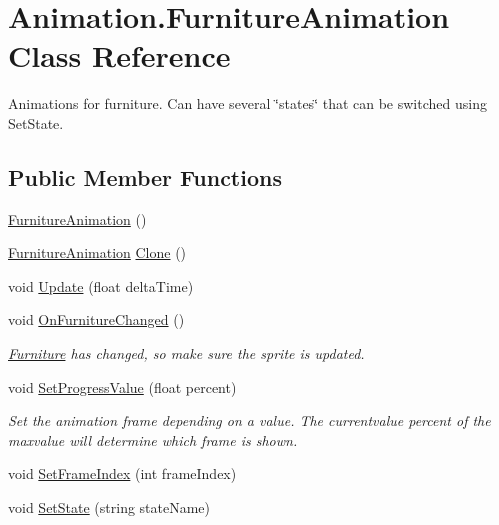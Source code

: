 \hypertarget{class_animation_1_1_furniture_animation}{}\section{Animation.\+Furniture\+Animation Class Reference}
\label{class_animation_1_1_furniture_animation}


Animations for furniture. Can have several \char`\"{}states\char`\"{} that can be switched using Set\+State.  


\subsection*{Public Member Functions}
\begin{DoxyCompactItemize}
\item 
\hyperlink{class_animation_1_1_furniture_animation_ab94f949cb697cba09ca8c73feeebcf0e}{Furniture\+Animation} ()
\item 
\hyperlink{class_animation_1_1_furniture_animation}{Furniture\+Animation} \hyperlink{class_animation_1_1_furniture_animation_a18c59f6b23e55576c2681476914eb4e7}{Clone} ()
\item 
void \hyperlink{class_animation_1_1_furniture_animation_a3ecc2e6776aaf24f511fb7661638c6b7}{Update} (float delta\+Time)
\item 
void \hyperlink{class_animation_1_1_furniture_animation_a018343ba77e8f7e0a1cb49945984fb4e}{On\+Furniture\+Changed} ()
\begin{DoxyCompactList}\small\item\em \hyperlink{class_furniture}{Furniture} has changed, so make sure the sprite is updated. \end{DoxyCompactList}\item 
void \hyperlink{class_animation_1_1_furniture_animation_ad984276ce0ed22c53012ff9854e0f67b}{Set\+Progress\+Value} (float percent)
\begin{DoxyCompactList}\small\item\em Set the animation frame depending on a value. The currentvalue percent of the maxvalue will determine which frame is shown. \end{DoxyCompactList}\item 
void \hyperlink{class_animation_1_1_furniture_animation_ac1f264484fde14992bd962a03f57e2b8}{Set\+Frame\+Index} (int frame\+Index)
\item 
void \hyperlink{class_animation_1_1_furniture_animation_aae47f2b0d9440472a8e7b4f1bba52e45}{Set\+State} (string state\+Name)

\end{DoxyCompactItemize}
